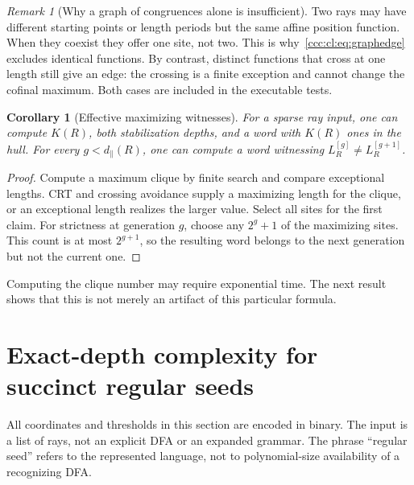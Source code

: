 \documentclass[11pt,letterpaper]{article}
\newtheorem{corollary}[theorem]{Corollary}
\theoremstyle{definition}
\theoremstyle{remark}
\newtheorem{remark}[theorem]{Remark}
\newcommand{\gen}[2]{#1^{[#2]}}
\begin{document}
\begin{remark}[Why a graph of congruences alone is insufficient]
Two rays may have different starting points or length periods but the
same affine position function. When they coexist they offer one site,
not two. This is why~\eqref{ccc:cl:eq:graphedge} excludes identical functions.
By contrast, distinct functions that cross at one length still give an
edge: the crossing is a finite exception and cannot change the cofinal
maximum. Both cases are included in the executable tests.
\end{remark}

\begin{corollary}[Effective maximizing witnesses]\label{ccc:cl:cor:maxwitness}
For a sparse ray input, one can compute $K(R)$, both stabilization depths,
and a word with $K(R)$ ones in the hull. For every $g<d_{\parallel}(R)$,
one can compute a word witnessing
$\gen{L_R}g\ne\gen{L_R}{g+1}$.
\end{corollary}
\begin{proof}
Compute a maximum clique by finite search and compare exceptional lengths.
CRT and crossing avoidance supply a maximizing length for the clique, or
an exceptional length realizes the larger value. Select all sites for the
first claim. For strictness at generation $g$, choose any $2^g+1$ of the
maximizing sites. This count is at most $2^{g+1}$, so the resulting word
belongs to the next generation but not the current one.
\end{proof}

Computing the clique number may require exponential time. The next result
shows that this is not merely an artifact of this particular formula.

\section{Exact-depth complexity for succinct regular seeds}\label{ccc:cl:sec:hardness}

All coordinates and thresholds in this section are encoded in binary.
The input is a list of rays, not an explicit DFA or an expanded grammar.
The phrase ``regular seed'' refers to the represented language, not to
polynomial-size availability of a recognizing DFA.
\end{document}
